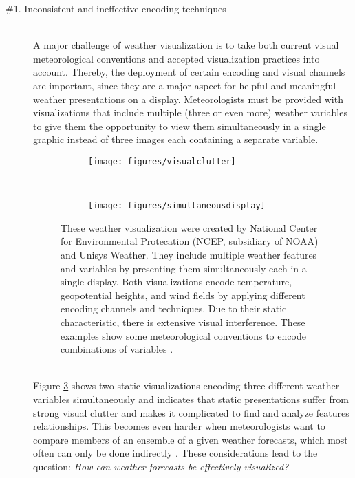 \documentclass[citeauthoryear]{llncs}
\begin{document}
\begin{description}
\item[\#1. Inconsistent and ineffective encoding techniques]  \ \\
A major challenge of weather visualization is to take both current visual meteorological conventions and accepted visualization practices into account. Thereby, the deployment of certain encoding and visual channels are important, since they are a major aspect for helpful and meaningful weather presentations on a display. Meteorologists must be provided with visualizations that include multiple (three or even more) weather variables to give them the opportunity to view them simultaneously in a single graphic instead of three images each containing a separate variable. \\
\vspace*{-0.5cm}
\begin{figure}[h]
	\centering
	\begin{subfigure}[t]{0.45\textwidth}
		\centering
		\texttt{[image: figures/visualclutter]} 
		\label{clutter}
	\end{subfigure}%
	~ ~ ~ ~
	\begin{subfigure}[t]{0.5\textwidth}
		\centering
		\texttt{[image: figures/simultaneousdisplay]} 
		\label{simultaneous}
	\end{subfigure}
	\vspace*{-0.5cm}
	\caption{{\small These weather visualization were created by National Center for Environmental Protecation (NCEP, subsidiary of NOAA) and Unisys Weather. They include multiple weather features and variables by presenting them simultaneously each in a single display. Both visualizations encode temperature, geopotential heights, and wind fields by applying different encoding channels and techniques. Due to their static characteristic, there is extensive visual interference. These examples show some meteorological conventions to encode combinations of variables \cite{quinan2016visually}.\label{simul}}}
\end{figure}
\vspace*{-0.5cm} \ \\
Figure \ref{simul} shows two static visualizations encoding three different weather variables simultaneously and indicates that static presentations suffer from strong visual clutter and makes it complicated to find and analyze features relationships. This becomes even harder when meteorologists want to compare members of an ensemble of a given weather forecasts, which most often can only be done indirectly \cite{quinan2016visually}. These considerations lead to the question: \textit{How can weather forecasts be effectively visualized?}\\

\end{description}
\end{document}
